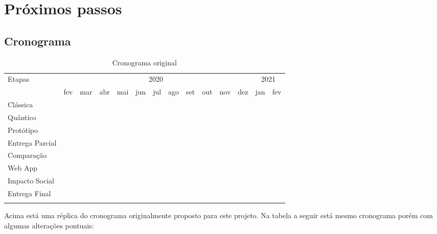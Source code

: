 \section{Próximos passos}
\label{next_steps}
\subsection{Cronograma}
\vspace{1cm}
\begin{longtable}{ |p{2.5cm}||p{0.60cm}|p{0.60cm}|p{0.60cm}|p{0.60cm}|p{0.60cm}|p{0.60cm}|p{0.60cm}|p{0.60cm}|p{0.60cm}|p{0.60cm}|p{0.60cm}|p{0.60cm}|p{0.60cm}|  }
  \hline
  \multirow{2}{*}{Etapas} & 
  \multicolumn{11}{|c|}{2020} & 
  \multicolumn{2}{|c|}{2021} \\
        &
    fev &
    mar &
    abr &
    mai &
    jun &
    jul &
    ago &
    set &
    out &
    nov &
    dez &
    jan &
    fev \\
  \hline
  Clássica & 
  \multicolumn{2}{|c|}{\cellcolor{blue!25}} & 
  & & & & & & & & & & \\
  \hline
  Quântico & 
  \multicolumn{2}{|c|}{\cellcolor{blue!25}} & 
  & & & & & & & & & & \\
  \hline
  Protótipo & &
  \multicolumn{4}{|c|}{\cellcolor{blue!25}} & 
  & & & & & & & \\
  \hline
  Entrega Parcial & & & &
  \multicolumn{5}{|c|}{\cellcolor{blue!25}} & 
  & & & & \\
  \hline
  Comparação & & & & & &
  \multicolumn{2}{|c|}{\cellcolor{blue!25}} & 
  & & & & & \\
  \hline
  Web App & &
  \multicolumn{8}{|c|}{\cellcolor{blue!25}} & 
  & & & \\
  \hline
  Impacto Social & & & & & & & &
  \multicolumn{4}{|c|}{\cellcolor{blue!25}} & 
  & \\
  \hline
  Entrega Final & & & & & & &
  \multicolumn{7}{|c|}{\cellcolor{blue!25}} \\
  \hline
  \caption{Cronograma original}
  \label{original_timeline}
\end{longtable}
\vspace{1cm}

Acima está uma réplica do cronograma originalmente proposto para este projeto. Na tabela a seguir está mesmo cronograma porém com algumas alterações pontuais:

